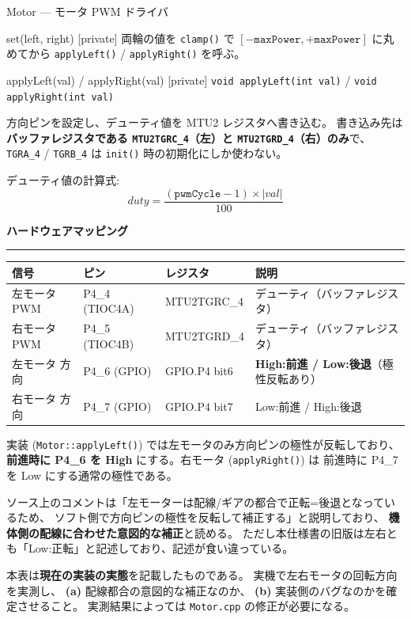 \documentclass[a4paper,11pt,dvipdfmx]{jsarticle}
\makeatletter
\newcommand{\apisection}[1]{%
  \par\addvspace{4mm}%
  {\normalsize\bfseries\color{headerblue} #1}%
  \par\vspace{-1mm}%
  {\color{accentblue!40}\rule{\linewidth}{0.5pt}}%
  \par\nobreak\vspace{2mm}%
  \@afterheading
}
\makeatother
\begin{document}
\begin{apibox}{Motor --- モータ PWM ドライバ}
\begin{funcblock}{set(left, right) \normalfont\small\color{gray}[private]}
\vspace{1.5mm}
両輪の値を \texttt{clamp()} で $[-\mathtt{maxPower}, +\mathtt{maxPower}]$ に丸めてから
\texttt{applyLeft()} / \texttt{applyRight()} を呼ぶ。
\end{funcblock}

\begin{funcblock}{applyLeft(val) / applyRight(val) \normalfont\small\color{gray}[private]}
\texttt{void applyLeft(int val)} / \texttt{void applyRight(int val)}

\vspace{1.5mm}
方向ピンを設定し、デューティ値を MTU2 レジスタへ書き込む。
書き込み先は\textbf{バッファレジスタである \texttt{MTU2TGRC\_4}（左）と
\texttt{MTU2TGRD\_4}（右）のみ}で、\texttt{TGRA\_4} / \texttt{TGRB\_4} は
\texttt{init()} 時の初期化にしか使わない。

\vspace{1.5mm}
デューティ値の計算式:
\[
  \mathit{duty} = \frac{(\mathtt{pwmCycle} - 1) \times |\mathit{val}|}{100}
\]
\end{funcblock}

\apisection{ハードウェアマッピング}

\begin{tabularx}{\textwidth}{l l l X}
\toprule
\textbf{信号} & \textbf{ピン} & \textbf{レジスタ} & \textbf{説明} \\
\midrule
左モータ PWM  & P4\_4 (TIOC4A) & MTU2TGRC\_4 & デューティ（バッファレジスタ） \\
右モータ PWM  & P4\_5 (TIOC4B) & MTU2TGRD\_4 & デューティ（バッファレジスタ） \\
左モータ 方向 & P4\_6 (GPIO)   & GPIO.P4 bit6 & \textbf{High:前進 / Low:後退}（極性反転あり） \\
右モータ 方向 & P4\_7 (GPIO)   & GPIO.P4 bit7 & Low:前進 / High:後退 \\
\bottomrule
\end{tabularx}

\begin{cautionbox}
実装 (\texttt{Motor::applyLeft()}) では左モータのみ方向ピンの極性が反転しており、
\textbf{前進時に P4\_6 を High} にする。右モータ (\texttt{applyRight()}) は
前進時に P4\_7 を Low にする通常の極性である。

ソース上のコメントは「左モーターは配線/ギアの都合で正転=後退となっているため、
ソフト側で方向ピンの極性を反転して補正する」と説明しており、
\textbf{機体側の配線に合わせた意図的な補正}と読める。
ただし本仕様書の旧版は左右とも「Low:正転」と記述しており、記述が食い違っている。

本表は\textbf{現在の実装の実態}を記載したものである。
実機で左右モータの回転方向を実測し、
\textbf{(a)} 配線都合の意図的な補正なのか、
\textbf{(b)} 実装側のバグなのかを確定させること。
実測結果によっては \texttt{Motor.cpp} の修正が必要になる。
\end{cautionbox}

\end{apibox}
\end{document}
